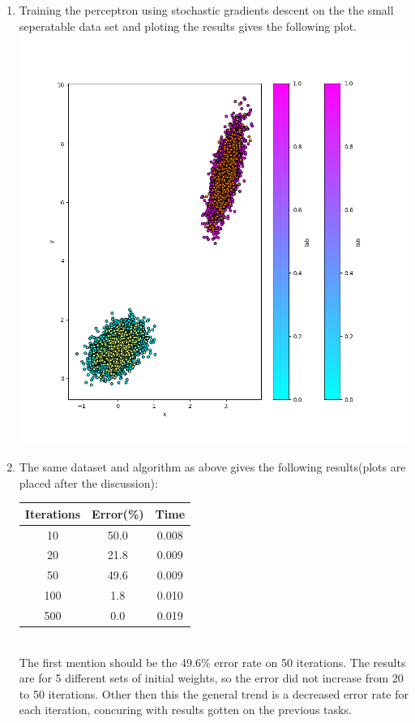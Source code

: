 \documentclass{article}
\begin{document}
\begin{enumerate}
\item Training the perceptron using stochastic gradients descent on the the
  small seperatable data set and ploting the results gives the following plot. \\
  \noindent\includegraphics[scale=0.7]{plots_percep}

\item The same dataset and algorithm as above gives the following results(plots
  are placed after the discussion): \\
  \begin{tabular}{|c|c|c|}
    \hline
    Iterations & Error(\%) & Time \\
    \hline
    10 & 50.0 & 0.008 \\
    20 & 21.8 & 0.009 \\
    50 & 49.6 & 0.009 \\
    100 & 1.8 & 0.010 \\
    500 & 0.0 & 0.019 \\
  \end{tabular} \\
  The first mention should be the 49.6\% error rate on 50 iterations. The
  results are for 5 different sets of initial weights, so the error did not increase from 20 to 50
  iterations. Other then this the general trend is a decreased error rate for
  each iteration, concuring with results gotten on the previous tasks.


\end{enumerate}
\end{document}
